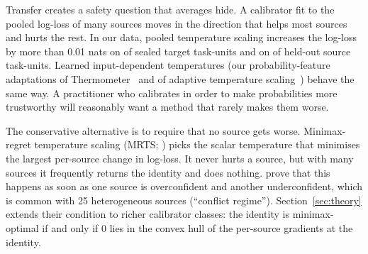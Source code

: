 \documentclass[11pt]{article}
\theoremstyle{remark}
\begin{document}
Transfer creates a safety question that averages hide.
A calibrator fit to the pooled log-loss of many sources moves in the direction that helps most sources and hurts the rest.
In our data, pooled temperature scaling increases the log-loss by more than 0.01 nats on \ConfPooledHarm{} of \NConfirm{} sealed target task-units and on \LotoPooledHarm{} of \NLoto{} held-out source task-units.
Learned input-dependent temperatures (our probability-feature adaptations of Thermometer~\citep{shen2024thermometer} and of adaptive temperature scaling~\citep{xie2024ats}) behave the same way.
A practitioner who calibrates in order to make probabilities more trustworthy will reasonably want a method that rarely makes them worse.

The conservative alternative is to require that no source gets worse.
Minimax-regret temperature scaling (MRTS; \citet{calport2026}) picks the scalar temperature that minimises the largest per-source change in log-loss.
It never hurts a source, but with many sources it frequently returns the identity and does nothing.
\citet{calport2026} prove that this happens as soon as one source is overconfident and another underconfident, which is common with 25 heterogeneous sources (``conflict regime'').
Section~\ref{sec:theory} extends their condition to richer calibrator classes: the identity is minimax-optimal if and only if $0$ lies in the convex hull of the per-source gradients at the identity.
\end{document}
